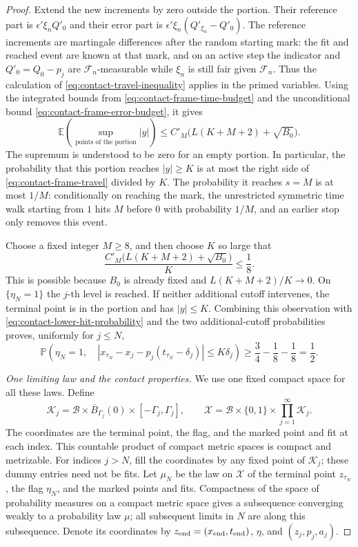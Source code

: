 \documentclass[11pt]{article}
\numberwithin{equation}{section}
\theoremstyle{definition}
\theoremstyle{remark}
\begin{document}
\begin{proof}
Extend the new increments by zero outside the portion.  Their reference
part is $\epsilon'\xi_nQ'_0$ and their error part is
$\epsilon'\xi_n(Q'_{\xi_n}-Q'_0)$.  The reference increments are martingale
differences after the random starting mark: the fit and reached event are
known at that mark, and on an active step the indicator and
$Q'_0=Q_0-p_j$ are $\mathcal F_n$-measurable while $\xi_n$ is still fair
given $\mathcal F_n$.  Thus the calculation of
\eqref{eq:contact-travel-inequality} applies in the primed variables.  Using
the integrated bounds from
\eqref{eq:contact-frame-time-budget} and the unconditional bound
\eqref{eq:contact-frame-error-budget}, it gives
\begin{equation}\label{eq:contact-frame-travel}
  \mathbb E\left(\sup_{\text{points of the portion}}|y|\right)
   \le C'_M\bigl(L(K+M+2)+\sqrt{B_0}\bigr).
\end{equation}
The supremum is understood to be zero for an empty portion.  In particular,
the probability that this portion reaches $|y|\ge K$ is at most the right
side of \eqref{eq:contact-frame-travel} divided by $K$.  The probability it
reaches $s=M$ is at most $1/M$: conditionally on reaching the mark, the
unrestricted symmetric time walk starting from $1$ hits $M$ before $0$ with
probability $1/M$, and an earlier stop only removes this event.

Choose a fixed integer $M\ge8$, and then choose $K$ so large that
\[
  \frac{C'_M\bigl(L(K+M+2)+\sqrt{B_0}\bigr)}{K}\le\frac18.
\]
This is possible because $B_0$ is already fixed and $L(K+M+2)/K\to0$.
On $\{\eta_N=1\}$ the $j$-th level is reached.  If neither additional
cutoff intervenes, the terminal point is in the portion and has $|y|\le K$.
Combining this observation with \eqref{eq:contact-lower-hit-probability}
and the two additional-cutoff probabilities proves, uniformly for $j\le N$,
\begin{equation}\label{eq:contact-finite-localization}
  \mathbb P\left(\eta_N=1,\quad
      |x_{\tau_N}-x_j-p_j(t_{\tau_N}-\delta_j)|\le K\delta_j\right)
       \ge\frac34-\frac18-\frac18=\frac12.
\end{equation}

\medskip\noindent\emph{One limiting law and the contact properties.}
We use one fixed compact space for all these laws.  Define
\[
  \mathcal K_j=\mathcal B\times\overline B_{\Gamma_j}(0)
                    \times[-\Gamma_j,\Gamma_j],
  \qquad
  \mathcal X=\mathcal B\times\{0,1\}\times\prod_{j=1}^{\infty}\mathcal K_j.
\]
The coordinates are the terminal point, the flag, and the marked point and
fit at each index.  This countable product of compact metric spaces is
compact and metrizable.  For indices $j>N$, fill the coordinates by any
fixed point of $\mathcal K_j$; these dummy entries need not be fits.  Let
$\mu_N$ be the law on $\mathcal X$ of the terminal point $z_{\tau_N}$, the
flag $\eta_N$, and the marked points and fits.  Compactness of the space
of probability measures on a compact metric space gives a subsequence
converging weakly to a probability law $\mu$; all subsequent limits in $N$
are along this subsequence.  Denote its coordinates by
$z_{\rm end}=(x_{\rm end},t_{\rm end})$, $\eta$, and
$(z_j,p_j,a_j)$.


\end{proof}
\end{document}
